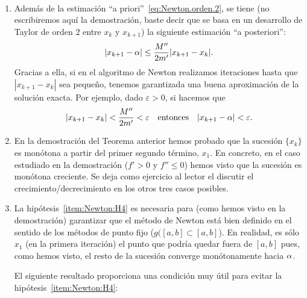 \begin{remark}~
  \label{rk:4}
  \begin{enumerate}
  \item Además de la estimación ``a
    priori''~\eqref{eq:Newton.orden.2}, se tiene (no escribiremos aquí
    la demostración, baste decir que se basa en un desarrollo de
    Taylor de orden $2$ entre $x_k$ y
    $x_{k+1}$) la siguiente estimación ``a posteriori'':
    \begin{equation}
      |x_{k+1}-\alpha| \le \frac{M''}{2m'}|x_{k+1}-x_k|.
      \label{eq:newton.estimac.a.posteriori}
    \end{equation}
    Gracias a ella, si en el algoritmo de Newton realizamos
    iteraciones hasta que $|x_{k+1}-x_k|$ sea pequeño, tenemos
    garantizada una buena aproximación de la solución exacta. Por
    ejemplo, dado $\varepsilon>0$, si hacemos que 
    $$
    |x_{k+1}-x_k| < \frac{M''}{2m'} < \varepsilon
    \quad\text{entonces}\quad  |x_{k+1}-\alpha| < \varepsilon.
    $$ 
  \item En la demostración del Teorema anterior hemos probado que la
    sucesión $\{x_k\}$ es monótona a partir del primer segundo
    término, $x_1$. En concreto, en el caso estudiado en la
    demostración ($f'>0$ y $f''\le 0$) hemos visto que la sucesión es
    monótona creciente. Se deja como ejercicio al lector el discutir
    el crecimiento/decrecimiento en los otros tres casos posibles.
  \item La hipótesis~\ref{item:Newton:H4} es necesaria para (como
    hemos visto en la demostración) garantizar que el método de Newton
    está bien definido en el sentido de los métodos de punto fijo
    ($g([a,b]\subset [a,b]$). En realidad, es sólo $x_1$ (en la
    primera iteración) el punto que podría quedar fuera de $[a,b]$
    pues, como hemos visto, el resto de la sucesión converge
    monótonamente hacia $\alpha$.

    El siguiente resultado proporciona una condición muy útil para
    evitar la hipótesis~\ref{item:Newton:H4}:
  \end{enumerate}
\end{remark}

